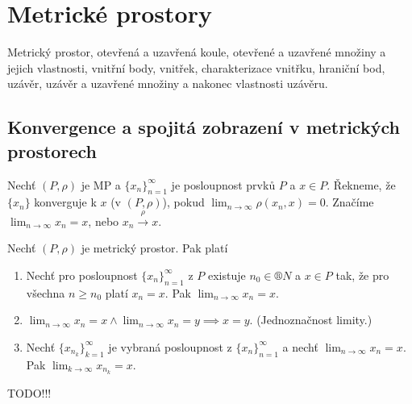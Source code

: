 \documentclass[12pt]{article}					%
\begin{document}


\section{Metrické prostory}

\begin{poznamka}[Opakovalo se:]
	Metrický prostor, otevřená a uzavřená koule, otevřené a uzavřené množiny a jejich vlastnosti, vnitřní body, vnitřek, charakterizace vnitřku, hraniční bod, uzávěr, uzávěr a uzavřené množiny a nakonec vlastnosti uzávěru.
\end{poznamka}

\subsection{Konvergence a spojitá zobrazení v metrických prostorech}
	\begin{definice}[Konvergence v MP]
		Nechť $(P, \rho)$ je MP a $\{x_n\}_{n=1}^∞$ je posloupnost prvků $P$ a $x \in P$. Řekneme, že $\{x_n\}$ konverguje k $x$ (v $(P, \rho)$), pokud $\lim_{n \rightarrow ∞} \rho(x_n, x) = 0$. Značíme $\lim_{n \rightarrow ∞} x_n = x$, nebo $x_n \overset{\rho}{\rightarrow} x$.
	\end{definice}

	\begin{veta}
		Nechť $(P, \rho)$ je metrický prostor. Pak platí
		
		\begin{enumerate}
			\item Nechť pro posloupnost $\{x_n\}_{n=1}^∞$ z $P$ existuje $n_0 \in ®N$ a $x \in P$ tak, že pro všechna $n ≥ n_0$ platí $x_n = x$. Pak $\lim_{n \rightarrow ∞} x_n = x$.
			\item $\lim_{n \rightarrow ∞} x_n = x \land \lim_{n \rightarrow ∞} x_n = y \implies x = y$. (Jednoznačnost limity.)
			\item Nechť $\{x_{n_k}\}_{k=1}^∞$ je vybraná posloupnost z $\{x_n\}_{n=1}^∞$ a nechť $\lim_{n \rightarrow ∞} x_n = x$. Pak $\lim_{k \rightarrow ∞} x_{n_k} = x$.
		\end{enumerate}

		\begin{dukazin}
			TODO!!!
		\end{dukazin}
	\end{veta}
\end{document}
